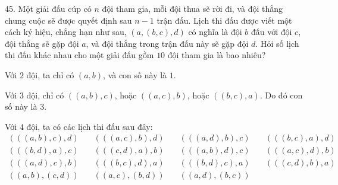 \begin{problem}{45.}
	Một giải đấu cúp có $n$ đội tham gia, mỗi đội thua sẽ rời đi, và đội thắng chung cuộc sẽ được quyết định sau $n-1$ trận đấu. Lịch thi đấu được viết một cách ký hiệu, chẳng hạn như sau, $(a,(b,c),d)$ có nghĩa là đội $b$ đấu với đội $c$, đội thắng sẽ gặp đội $a$, và đội thắng trong trận đấu này sẽ gặp đội $d$. Hỏi số lịch thi đấu khác nhau cho một giải đấu gồm $10$ đội tham gia là bao nhiêu?

	Với $2$ đội, ta chỉ có $(a,b)$, và con số này là $1$.

	Với $3$ đội, chỉ có  $((a,b),c)$, hoặc $ ((a,c),b)$, hoặc $ ((b,c),a)$. Do đó  con số này là $3$.

	Với $4$ đội, ta có các lịch thi đấu sau đây:
	$$
	\begin{array}{llll}
	(((a,b),c),d)  \quad & (((a,c),b),d) \quad&(((a,d),b),c) \quad&  (((b,c),a),d)\\
	(((b,d),a),c) \quad& (((c,d),a),b) \quad& (((a,b),d),c)\quad & (((a,c),d),b)\\
	(((a,d),c),b) \quad& (((b,c),d),a) \quad& (((b,d),c),a) \quad& (((c,d),b),a)\\
	((a,b),(c,d))\quad & ((a,c),(b,d))\quad&((a,d),(b,c))\quad &
	\end{array}$$
\end{problem}

